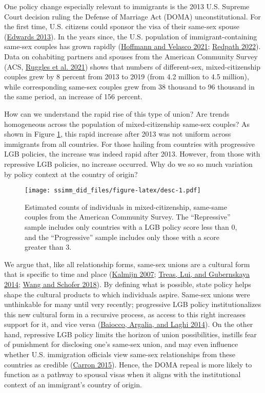 \documentclass[
  12pt,
]{article}
\begin{document}
One policy change especially relevant to immigrants is the 2013 U.S. Supreme Court decision ruling the Defense of Marriage Act (DOMA) unconstitutional. For the first time, U.S. citizens could sponsor the visa of their same-sex spouse (\protect\hyperlink{ref-edwards_2013}{Edwards 2013}). In the years since, the U.S. population of immigrant-containing same-sex couples has grown rapidly (\protect\hyperlink{ref-hoffmann_2021_making}{Hoffmann and Velasco 2021}; \protect\hyperlink{ref-redpath_2022_spousal}{Redpath 2022}). Data on cohabiting partners and spouses from the American Community Survey (ACS, \protect\hyperlink{ref-ruggles_2021}{Ruggles et al. 2021}) shows that numbers of different-sex, mixed-citizenship couples grew by 8 percent from 2013 to 2019 (from 4.2 million to 4.5 million), while corresponding same-sex couples grew from 38 thousand to 96 thousand in the same period, an increase of 156 percent.

How can we understand the rapid rise of this type of union? Are trends homogeneous across the population of mixed-citizenship same-sex couples? As shown in Figure \ref{fig:desc}, this rapid increase after 2013 was not uniform across immigrants from all countries. For those hailing from countries with progressive LGB policies, the increase was indeed rapid after 2013. However, from those with repressive LGB policies, no increase occurred. Why do we so so much variation by policy context at the country of origin?

\begin{figure}
\centering
\texttt{[image: ssimm\_did\_files/figure-latex/desc-1.pdf]}
\caption{\label{fig:desc}Estimated counts of individuals in mixed-citizenship, same-same couples from the American Community Survey. The ``Repressive'' sample includes only countries with a LGB policy score less than 0, and the ``Progressive'' sample includes only those with a score greater than 3.}
\end{figure}

We argue that, like all relationship forms, same-sex unions are a cultural form that is specific to time and place (\protect\hyperlink{ref-kalmijn_2007_explaining}{Kalmijn 2007}; \protect\hyperlink{ref-treas_2014_attitudes}{Treas, Lui, and Gubernskaya 2014}; \protect\hyperlink{ref-wang_2018_coming}{Wang and Schofer 2018}). By defining what is possible, state policy helps shape the cultural products to which individuals aspire. Same-sex unions were unthinkable for many until very recently; progressive LGB policy institutionalizes this new cultural form in a recursive process, as access to this right increases support for it, and vice versa (\protect\hyperlink{ref-baiocco_2014_desire}{Baiocco, Argalia, and Laghi 2014}). On the other hand, repressive LGB policy limits the horizon of union possibilities, instills fear of punishment for disclosing one's same-sex union, and may even influence whether U.S. immigration officials view same-sex relationships from these countries as credible (\protect\hyperlink{ref-carron_2015_marriagebased}{Carron 2015}). Hence, the DOMA repeal is more likely to function as a pathway to spousal visas when it aligns with the institutional context of an immigrant's country of origin.
\end{document}
